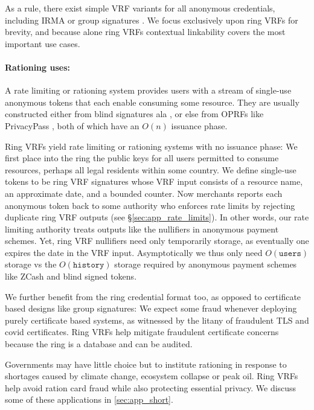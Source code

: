 As a rule, there exist simple VRF variants for all anonymous credentials,
including IRMA \cite{IRMAcredentials} or group signatures \cite{group_sig_survey}.
We focus exclusively upon ring VRFs for brevity, and because alone
ring VRFs contextual linkability covers the most important use cases.

\paragraph{Rationing uses:}

A rate limiting or rationing system provides users with a stream
of single-use anonymous tokens that each enable consuming some resource.
They are usually constructed either
from blind signatures ala \cite{chaum83}, or else
from OPRFs like PrivacyPass \cite{PrivacyPass},
both of which have an $O(n)$ issuance phase.

Ring VRFs yield rate limiting or rationing systems with no issuance phase:
We first place into the ring the public keys for all users permitted to
consume resources, perhaps all legal residents within some country.  
We define single-use tokens to be ring VRF signatures whose VRF input
consists of a resource name, an approximate date, and a bounded counter.
Now merchants reports each anonymous token back to some authority who
enforces rate limits by rejecting duplicate ring VRF outputs
(see \S\ref{sec:app_rate_limits}).
In other words, our rate limiting authority treats outputs like the
nullifiers in anonymous payment schemes.
Yet, ring VRF nullifiers need only temporarily storage, as eventually one
expires the date in the VRF input.  Asymptotically we thus only need
$O(\mathtt{users})$ storage vs the $O(\mathtt{history})$ storage
required by anonymous payment schemes like ZCash and blind signed tokens.

We further benefit from the ring credential format too,
as opposed to certificate based designs like group signatures:
We expect some fraud whenever deploying purely certificate
based systems, as witnessed by the litany of fraudulent TLS and covid
certificates.  Ring VRFs help mitigate fraudulent certificate concerns
because the ring is a database and can be audited.

Governments may have little choice but to institute
rationing in response to shortages caused by climate change, ecosystem
collapse or peak oil.  Ring VRFs help avoid ration card fraud
while also protecting essential privacy. We discuss some of these 
applications in \ref{sec:app_short}.
%

